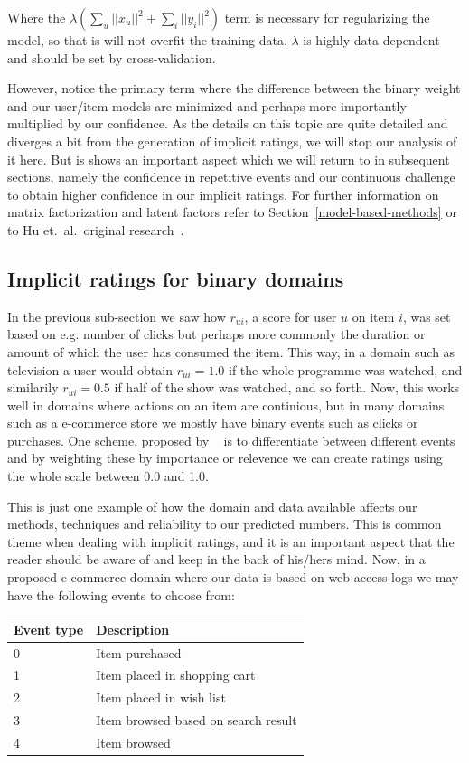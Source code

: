 Where the $\lambda (\sum _{u} || x_u ||^2 + \sum_{i} || y_i ||^2)$ term is
necessary for regularizing the model, so that is will not overfit the
training data. $\lambda$ is highly data dependent and should be set by
cross-validation.

However, notice the primary term where the difference between the binary weight
and our user/item-models are minimized and perhaps more importantly multiplied
by our confidence. As the details on this topic are quite detailed and diverges
a bit from the generation of implicit ratings, we will stop our analysis of it
here. But is shows an important aspect which we will return to in subsequent
sections, namely the confidence in repetitive events and our continuous
challenge to obtain higher confidence in our implicit ratings. For further
information on matrix factorization and latent factors refer to
Section~\ref{model-based-methods} or to Hu et.\ al.\ original
research~\cite{Hu2008}.

\subsection{Implicit ratings for binary domains}

In the previous sub-section we saw how $r_{ui}$, a score for user $u$ on item
$i$, was set based on e.g. number of clicks but perhaps more commonly the
duration or amount of which the user has consumed the item. This way, in a
domain such as television a user would obtain $r_{ui} = 1.0$ if the whole
programme was watched, and similarily $r_{ui} = 0.5$ if half of the show was
watched, and so forth. Now, this works well in domains where actions on an item
are continious, but in many domains such as a e-commerce store we mostly have
binary events such as clicks or purchases. One scheme, proposed by
~\cite{pkghost2014implicit} is to differentiate between different events and by
weighting these by importance or relevence we can create ratings using the
whole scale between 0.0 and 1.0.

This is just one example of how the domain and data available affects our
methods, techniques and reliability to our predicted numbers. This is common
theme when dealing with implicit ratings, and it is an important aspect that
the reader should be aware of and keep in the back of his/hers mind. Now, in a
proposed e-commerce domain where our data is based on web-access logs we may
have the following events to choose from:

\begin{table}[H]
  \centering
  \begin{tabular}{ll}
  \toprule
  Event type & Description \\ \midrule
  0 & Item purchased \\
  1 & Item placed in shopping cart \\
  2 & Item placed in wish list \\
  3 & Item browsed based on search result \\
  4 & Item browsed \\
  \bottomrule
  \end{tabular}
\end{table}

